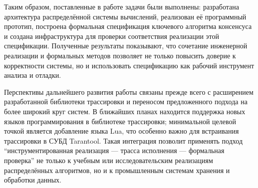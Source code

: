 Таким образом, поставленные в работе задачи были выполнены:
разработана архитектура распределённой системы вычислений,
реализован её программный прототип, построена формальная спецификация
ключевого алгоритма консенсуса и создана инфраструктура для проверки
соответствия реализации этой спецификации.
Полученные результаты показывают, что сочетание инженерной реализации
и формальных методов позволяет не только повысить доверие к корректности
системы, но и использовать спецификацию как рабочий инструмент анализа
и отладки.

Перспективы дальнейшего развития работы связаны прежде всего с расширением
разработанной библиотеки трассировки и переносом предложенного подхода на более
широкий круг систем. В ближайших планах находится поддержка новых языков
программирования в библиотеке трассировки; минимальной целевой точкой является
добавление языка Lua, что особенно важно для встраивания трассировки в СУБД
Tarantool. Такая интеграция позволит применять подход ``инструментированная
реализация --- трасса исполнения --- формальная проверка'' не только к учебным
или исследовательским реализациям распределённых алгоритмов, но и к
промышленным системам хранения и обработки данных.
